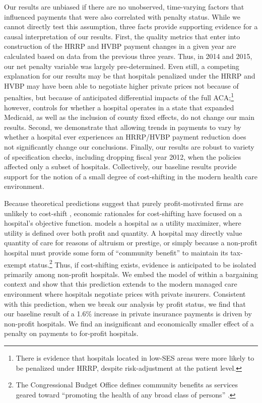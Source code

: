 \documentclass[12pt]{article}
\begin{document}
Our results are unbiased if there are no unobserved, time-varying factors that influenced payments that were also correlated with penalty status.  While we cannot directly test this assumption, three facts provide supporting evidence for a causal interpretation of our results.  First, the quality metrics that enter into construction of the HRRP and HVBP payment changes in a given year are calculated based on data from the previous three years.  Thus, in 2014 and 2015, our net penalty variable was largely pre-determined.  Even still, a competing explanation for our results may be that hospitals penalized under the HRRP and HVBP may have been able to negotiate higher private prices not because of penalties, but because of anticipated differential impacts of the full ACA;\footnote{There is evidence that hospitals located in low-SES areas were more likely to be penalized under HRRP, despite risk-adjustment at the patient level.} however, controls for whether a hospital operates in a state that expanded Medicaid, as well as the inclusion of county fixed effects, do not change our main results. Second, we demonstrate that allowing trends in payments to vary by whether a hospital ever experiences an HRRP/HVBP payment reduction does not significantly change our conclusions.  Finally, our results are robust to variety of specification checks, including dropping fiscal year 2012, when the policies affected only a subset of hospitals.  Collectively, our baseline results provide support for the notion of a small degree of cost-shifting in the modern health care environment.

Because theoretical predictions suggest that purely profit-motivated firms are unlikely to cost-shift \citep{hay1983}, economic rationales for cost-shifting have focused on a hospital's objective function.  \cite{dranove1988} models a hospital as a utility maximizer, where utility is defined over both profit and quantity.  A hospital may directly value quantity of care for reasons of altruism or prestige, or simply because a non-profit hospital must provide some form of ``community benefit'' to maintain its tax-exempt status.\footnote{The Congressional Budget Office defines community benefits as services geared toward ``promoting the health of any broad class of persons'' \citep{cbo2006}.}  Thus, if cost-shifting exists, evidence is anticipated to be isolated primarily among non-profit hospitals. We embed the model of \cite{dranove1988} within a bargaining context and show that this prediction extends to the modern managed care environment where hospitals negotiate prices with private insurers. Consistent with this prediction, when we break our analysis by profit status, we find that our baseline result of a 1.6$\%$ increase in private insurance payments is driven by non-profit hospitals.  We find an insignificant and economically smaller effect of a penalty on payments to for-profit hospitals.
\end{document}

